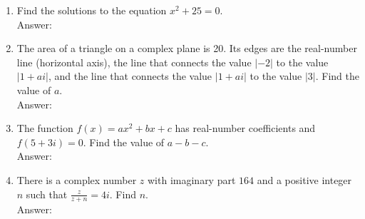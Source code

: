 \documentclass[12pt]{extarticle}
\begin{document}
\begin{enumerate}
{\begin{enumerate}
        \end{enumerate}
    }
    \item {Find the solutions to the equation $x^2 + 25 = 0$. \\Answer: }
    \item {The area of a triangle on a complex plane is 20. Its edges are the real-number line (horizontal axis), the line that connects the value $|-2|$ to the value $|1+ai|$, and the line that connects the value $|1+ai|$ to the value $|3|$. Find the value of $a$. \\Answer: }
    \item {The function $f(x) = ax^2+bx+c$ has real-number coefficients and $f(5+3i) = 0$. Find the value of $a-b-c$. \\Answer: }
    \item {There is a complex number $z$ with imaginary part $164$ and a positive integer $n$ such that $\frac{z}{z + n} = 4i$. Find $n$. \\Answer: }
\end{enumerate}
\end{document}
